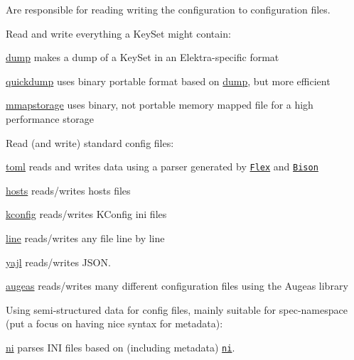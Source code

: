 Are responsible for reading writing the configuration to configuration files.

Read and write everything a Key\+Set might contain\+:


\begin{DoxyItemize}
\item \hyperlink{autotoc_md194_src_plugins_dump_README_md}{dump} makes a dump of a Key\+Set in an Elektra-\/specific format
\item \hyperlink{autotoc_md533_src_plugins_quickdump_README_md}{quickdump} uses binary portable format based on \hyperlink{autotoc_md194_src_plugins_dump_README_md}{dump}, but more efficient
\item \hyperlink{autotoc_md404_src_plugins_mmapstorage_README_md}{mmapstorage} uses binary, not portable memory mapped file for a high performance storage
\end{DoxyItemize}

Read (and write) standard config files\+:


\begin{DoxyItemize}
\item \hyperlink{autotoc_md642_src_plugins_toml_README_md}{toml} reads and writes data using a parser generated by \href{https://github.com/westes/flex}{\tt Flex} and \href{https://www.gnu.org/software/bison}{\tt Bison}
\item \hyperlink{autotoc_md265_src_plugins_hosts_README_md}{hosts} reads/writes hosts files
\item \hyperlink{autotoc_md322_src_plugins_kconfig_README_md}{kconfig} reads/writes K\+Config ini files
\item \hyperlink{autotoc_md346_src_plugins_line_README_md}{line} reads/writes any file line by line
\item \hyperlink{autotoc_md786_src_plugins_yajl_README_md}{yajl} reads/writes J\+S\+ON.
\item \hyperlink{autotoc_md43_src_plugins_augeas_README_md}{augeas} reads/writes many different configuration files using the Augeas library
\end{DoxyItemize}

Using semi-\/structured data for config files, mainly suitable for spec-\/namespace (put a focus on having nice syntax for metadata)\+:


\begin{DoxyItemize}
\item \hyperlink{autotoc_md475_src_plugins_ni_README_md}{ni} parses I\+NI files based on (including metadata) \href{https://lab.burn.capital/chaz-attic/bohr/-/blob/main/include/bohr/ni.h}{\tt ni}.
\end{DoxyItemize}

